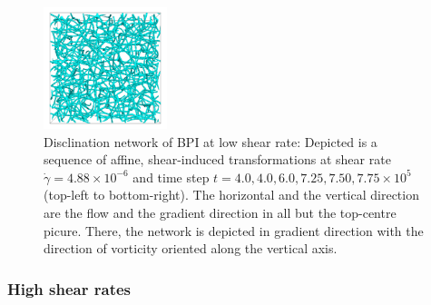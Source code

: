 \documentclass[aps,pre,reprint,superscriptaddress]{revtex4}
\newcommand{\e}[1]{\times10^{#1}}
\begin{document}
\begin{figure}[h]
\includegraphics[width=0.32\textwidth]{disc-xy-2200k_run1115.png}
\caption{Disclination network of BPI at low shear rate: Depicted is a sequence of affine, shear-induced transformations at shear rate $\dot{\gamma}=4.88\e{-6}$ and time step $t=4.0, 4.0, 6.0, 7.25, 7.50, 7.75\e{5}$ (top-left to bottom-right). The horizontal and the vertical direction are the flow and the gradient direction in all but the top-centre picure. There, the network is depicted in gradient direction with the direction of vorticity oriented along the vertical axis.}
\label{bp1-low}
\end{figure}

\subsubsection{High shear rates}
\end{document}
